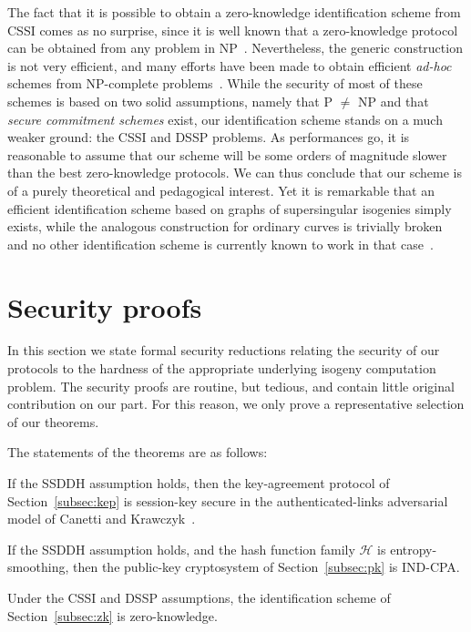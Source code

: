 The fact that it is possible to obtain a zero-knowledge identification
scheme from CSSI comes as no surprise, since it is well known that a
zero-knowledge protocol can be obtained from any problem in
NP~\cite{goldreich+micali+widgerson91}. Nevertheless, the generic
construction is not very efficient, and many efforts have been made to
obtain efficient \emph{ad-hoc} schemes from NP-complete
problems~\cite{shamir89-pkp,stern94-CLE,stern94-SD,pointcheval95-pp}. While
the security of most of these schemes is based on two solid
assumptions, namely that P $\ne$ NP and that \emph{secure commitment
  schemes} exist, our identification scheme stands on a much
weaker ground: the CSSI and DSSP problems. As performances go, it is
reasonable to assume that our scheme will be some orders of magnitude
slower than the best zero-knowledge protocols. We can thus conclude
that our scheme is of a purely theoretical and pedagogical interest.
Yet it is remarkable that an efficient identification scheme based on
graphs of supersingular isogenies simply exists, while the analogous
construction for ordinary curves is trivially broken and no other
identification scheme is currently known to work in that
case~\cite{Stol}.

\section{Security proofs}\label{sec:proof}



In this section we state formal security reductions relating the
security of our protocols to the hardness of the appropriate
underlying isogeny computation problem. The security proofs are
routine, but tedious, and contain little original contribution on
our part. For this reason, we only prove a representative selection
of our theorems.

The statements of the theorems are as follows:

\begin{theorem}\label{thm:kep-proof}
If the SSDDH assumption holds, then the key-agreement protocol of
Section~\ref{subsec:kep} is session-key secure in the
authenticated-links adversarial model of Canetti and
Krawczyk~\cite{canetti}.
\end{theorem}
\begin{theorem}\label{thm:pk-proof}
If the SSDDH assumption holds, and the hash function family
$\mathcal{H}$ is entropy-smoothing, then the public-key cryptosystem
of Section~\ref{subsec:pk} is IND-CPA.
\end{theorem}
\begin{theorem}\label{thm:zk-proof}
  Under the CSSI and DSSP assumptions, the identification scheme of
  Section~\ref{subsec:zk} is zero-knowledge.
\end{theorem}

